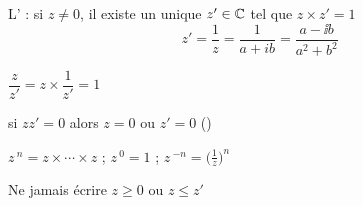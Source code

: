 \begin{frame}

\vspace*{1cm}

 \begin{itemize}
  \item L' : si $z \neq 0$, il existe un unique $z' \in \mathbb{C}$ tel
  que $z \times z' = 1$
\pause
\[ z' = \frac{1}{z} = \frac{1}{a + ib} = \frac{a - \ii b}{a^2 + b^2}  \]

\pause
{
  \item %
$\dfrac{z}{z'}=z \times \dfrac{1}{z'} = 1$\\[1em]

\pause

  \item  si \quad  $zz' = 0$ \quad  alors \quad  $z = 0$ ou $z' = 0$ \qquad  ()\\[1em]

\pause

  \item %
$z{\,}^n = z \times \cdots \times z$ \quad ; \quad  $z{\,}^0 = 1$ \quad ; \quad $z{\,}^{- n} = \big( \frac 1 z \big)^n$
}

\end{itemize}

\pause
\bigskip
\bigskip

\begin{remarque}
  Ne \alert{jamais} écrire $z \geqslant 0$ ou $z \leqslant z'$
\end{remarque}


\end{frame}
